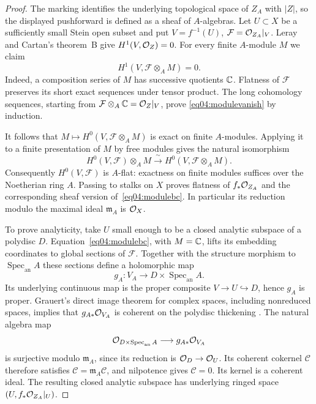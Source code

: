 \begin{proof}
The marking identifies the underlying topological space of $Z_A$ with
$|Z|$, so the displayed pushforward is defined as a sheaf of $A$-algebras.
Let $U\subset X$ be a sufficiently small Stein open subset and put
$V=f^{-1}(U)$, $\mathcal F=\mathcal{O}_{Z_A}|_V$.  Leray and Cartan's theorem~B
give $H^1(V,\mathcal{O}_Z)=0$.  For every finite $A$-module $M$ we claim
\begin{equation}\label{eq04:modulevanish}
 H^1(V,\mathcal F\otimes_A M)=0.
\end{equation}
Indeed, a composition series of $M$ has successive quotients $\mathbb{C}$.
Flatness of $\mathcal F$ preserves its short exact sequences under
tensor product.  The long cohomology sequences, starting from
$\mathcal F\otimes_A\mathbb{C}=\mathcal{O}_Z|_V$, prove
\eqref{eq04:modulevanish} by induction.

It follows that $M\mapsto H^0(V,\mathcal F\otimes_A M)$ is exact on
finite $A$-modules.  Applying it to a finite presentation of $M$ by free
modules gives the natural isomorphism
\begin{equation}\label{eq04:modulebc}
 H^0(V,\mathcal F)\otimes_A M
       \xrightarrow{\ \sim\ }H^0(V,\mathcal F\otimes_A M).
\end{equation}
Consequently $H^0(V,\mathcal F)$ is $A$-flat: exactness on finite
modules suffices over the Noetherian ring $A$.  Passing to stalks on
$X$ proves flatness of $f_*\mathcal{O}_{Z_A}$ and the corresponding sheaf
version of~\eqref{eq04:modulebc}.  In particular its reduction modulo
the maximal ideal $\mathfrak m_A$ is $\mathcal{O}_X$.

To prove analyticity, take $U$ small enough to be a closed analytic
subspace of a polydisc $D$.  Equation~\eqref{eq04:modulebc}, with
$M=\mathbb{C}$, lifts its embedding coordinates to global sections of
$\mathcal F$.  Together with the structure morphism to
$\operatorname{Spec}_{\mathrm{an}}A$ these sections define a holomorphic
map
\[
 g_A:V_A\longrightarrow D\times\operatorname{Spec}_{\mathrm{an}}A.
\]
Its underlying continuous map is the proper composite
$V\to U\hookrightarrow D$, hence $g_A$ is proper.  Grauert's direct
image theorem for complex spaces, including nonreduced spaces,
implies that $g_{A*}\mathcal{O}_{V_A}$ is coherent on the polydisc thickening
\cite[\S6, Hauptsatz~I]{grauert1960}.  The natural algebra map
\[
 \mathcal{O}_{D\times\operatorname{Spec}_{\mathrm{an}}A}
                   \longrightarrow g_{A*}\mathcal{O}_{V_A}
\]
is surjective modulo $\mathfrak m_A$, since its reduction is
$\mathcal{O}_D\to\mathcal{O}_U$.  Its coherent cokernel $\mathcal C$ therefore
satisfies $\mathcal C=\mathfrak m_A\mathcal C$, and nilpotence gives
$\mathcal C=0$.  Its kernel is a coherent ideal.  The resulting closed
analytic subspace has underlying ringed space
$(U,f_*\mathcal{O}_{Z_A}|_U)$.


\end{proof}
